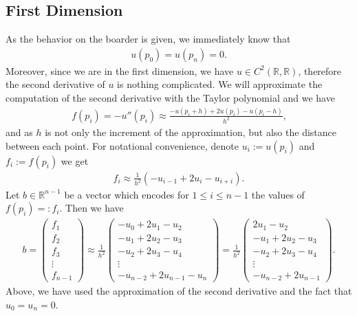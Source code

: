 \subsection{First Dimension}
As the behavior on the boarder is given, we immediately know that
\begin{align*}
    u(p_0) = u(p_n) = 0 \text{.}
\end{align*}
Moreover, since we are in the first dimension, we have \(u \in C^2(\mathbb{R}, \mathbb{R})\), therefore the second derivative of \(u\) is nothing complicated. We will approximate the computation of the second derivative with the Taylor polynomial and we have
\begin{align*}
    f(p_i) = -u''(p_i) \approx \frac{-u(p_i + h) + 2u(p_i) - u(p_i - h)}{h^2} \text{,}
\end{align*}
and as \(h\) is not only the increment of the approximation, but also the distance between each point. For notational convenience, denote \(u_i := u(p_i)\) and \(f_i := f(p_i)\)  we get
\begin{align*}
    f_i \approx \frac{1}{h^2} (-u_{i - 1} + 2u_i - u_{i + i}) \text{.}
\end{align*}
Let \(b \in \mathbb{R}^{n-1}\) be a vector which encodes for \(1 \leq i \leq n-1\) the values of \(f(p_i) =: f_i\). Then we have
\begin{align*}
    b =
    \begin{pmatrix}
        f_1 \\
        f_2 \\
        f_3 \\
        \vdots \\
        f_{n-1}
    \end{pmatrix}
    \approx
    \frac{1}{h^2}
    \begin{pmatrix}
        -u_0 + 2u_1 -u_2 \\
        -u_1 + 2u_2 -u_3 \\
        -u_2 + 2u_3 -u_4 \\
        \vdots \\
        -u_{n-2} + 2u_{n-1} -u_{n}
    \end{pmatrix}
    =
    \frac{1}{h^2}
    \begin{pmatrix}
        2u_1 -u_2 \\
        -u_1 + 2u_2 -u_3 \\
        -u_2 + 2u_3 -u_4 \\
        \vdots \\
        -u_{n-2} + 2u_{n-1}
    \end{pmatrix} \text{.}
\end{align*}
Above, we have used the approximation of the second derivative and the fact that \(u_0 = u_n = 0\).


